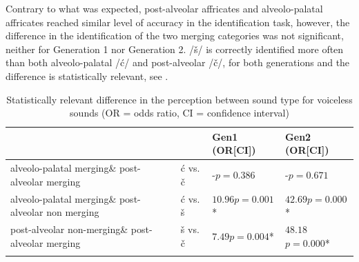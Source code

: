 \documentclass[output=paper,modfonts,newtxmath,hidelinks,]{langscibook}
\begin{document}
Contrary to what was expected, post-alveolar affricates and alveolo-palatal affricates reached similar level of accuracy in the identification task, however, the difference in the identification of the two merging categories was not significant, neither for Generation 1 nor Generation 2. /š/ is correctly identified more often than both alveolo-palatal /ć/ and post-alveolar /č/, for both generations and the difference is statistically relevant, see .

\begin{table}
\begin{tabularx}{\textwidth}{p{4.5cm}lXX}
\lsptoprule
&  &  \textbf{Gen1} (OR[CI]) &  \textbf{Gen2} (OR[CI])\\
\midrule
alveolo-palatal merging\newline\& post-alveolar merging & ć vs. č & {}-\newline $p=0.386$ & {}-\newline $p=0.671$\vspace{20pt}\\
alveolo-palatal merging\newline\& post-alveolar non merging & ć vs. š & $10.96$\newline[$2.85$--$42.06$]\newline $p=0.001$*& $42.69$\newline[$9.89$--$184.38$]\newline $p=0.000$*\vspace{6pt}\\
post-alveolar non-merging\newline\& post-alveolar merging & š vs. č & $7.49$\newline[$1.07$--$29.05$]\newline $p=0.004$* & $48.18$ \newline [$11.17$--$207.89$]\newline $p=0.000$*\\
\lspbottomrule
\end{tabularx}
\caption{\label{tab:mihajlovic:7} Statistically relevant difference in the perception between sound type for voiceless sounds (OR = odds ratio, CI = confidence interval)}
\end{table}
\end{document}
